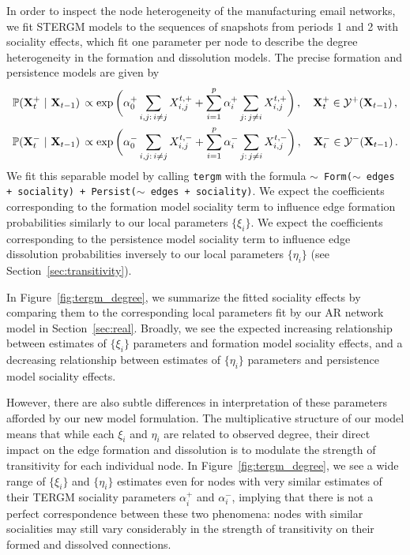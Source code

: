 \documentclass[12pt]{article}
\newcommand{\0}{{\bf 0}}
\begin{document}
In order to inspect the node heterogeneity of the manufacturing email networks, we fit STERGM models to the sequences of snapshots from periods 1 and 2 with sociality effects, which fit one parameter per node to describe the degree heterogeneity in the formation and dissolution models.
The precise formation and persistence models are given by
\begin{align*}
    \mathbb{P}({\bf X}^+_t ~\vert~ {\bf X}_{t-1})\, &\propto \exp\bigg( \alpha^{+}_0 \sum_{i,j:\, i \neq j} X_{i,j}^{t,+} + \sum_{i=1}^p \alpha^+_i \sum_{j:\,j \neq i} X_{i,j}^{t,+} \bigg)\,, \quad {\bf X}^+_t \in \mathcal{Y}^{+}({\bf X}_{t-1})\,, \\
    \mathbb{P}({\bf X}_t^- ~\vert~ {\bf X}_{t-1})\, &\propto \exp\bigg(\alpha^{-}_0 \sum_{i,j:\, i \neq j} X_{i,j}^{t,-} + \sum_{i=1}^p \alpha^-_i \sum_{j:\,j \neq i} X_{i,j}^{t,-} \bigg)\,, \quad {\bf X}_t^- \in \mathcal{Y}^{-}({\bf X}_{t-1})\,.
\end{align*}
We fit this separable model by calling \texttt{tergm} with the formula \texttt{$\sim$ Form($\sim$ edges + sociality) + Persist($\sim$ edges + sociality)}. 
We expect the coefficients corresponding to the formation model sociality term to influence edge formation probabilities similarly to our local parameters $\{\xi_i\}$. We expect the coefficients corresponding to the persistence model sociality term to influence edge dissolution probabilities inversely to our local parameters $\{\eta_i\}$ (see Section~\ref{sec:transitivity}).

In Figure~\ref{fig:tergm_degree}, we summarize the fitted sociality effects by comparing them to the corresponding local parameters fit by our AR network model in Section~\ref{sec:real}.
Broadly, we see the expected increasing relationship between estimates of $\{\xi_i\}$ parameters and formation model sociality effects, and a decreasing relationship between estimates of $\{\eta_i\}$ parameters and persistence model sociality effects.

However, there are also subtle differences in interpretation of these parameters afforded by our new model formulation. The multiplicative structure of our model means that while each $\xi_i$ and $\eta_i$ are related to observed degree, their direct impact on the edge formation and dissolution is to modulate the strength of transitivity for each individual node.
In Figure~\ref{fig:tergm_degree}, we see a wide range of $\{\xi_i\}$ and $\{\eta_i\}$ estimates even for nodes with very similar estimates of their TERGM sociality parameters $\alpha^+_i$ and $\alpha^-_i$, implying that there is not a perfect correspondence between these two phenomena: nodes with similar socialities may still vary considerably in the strength of transitivity on their formed and dissolved connections. 
\end{document}
